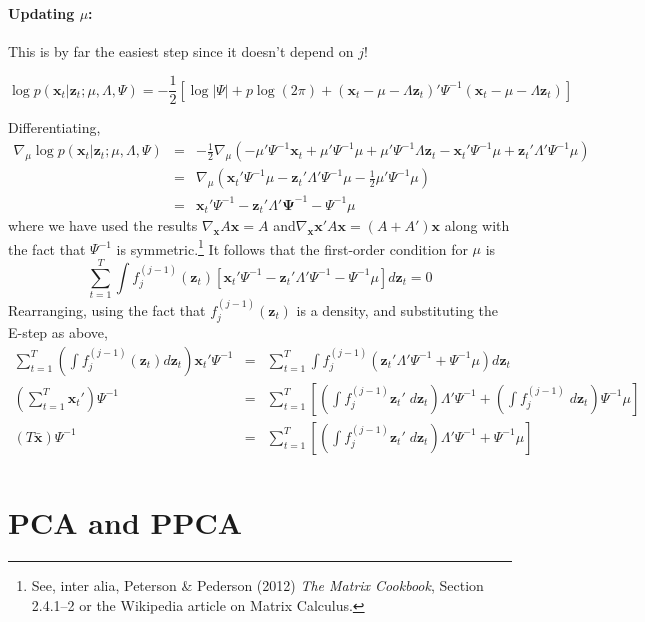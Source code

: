 \documentclass[12pt]{article}
\theoremstyle{definition}
\begin{document}
\paragraph{Updating $\mu$:} This is by far the easiest step since it doesn't depend on $j$!


	$$\log p(\textbf{x}_t| \textbf{z}_t;\mu, \Lambda, \Psi) = -\frac{1}{2}\left[  \log |\Psi| + p \log(2\pi) +(\mathbf{x}_t - \mu -  \Lambda \textbf{z}_t)' \Psi^{-1} (\mathbf{x}_t - \mu -  \Lambda \textbf{z}_t)\right] $$

Differentiating,
 \begin{eqnarray*}
 	\nabla_\mu \log p(\mathbf{x}_t|\mathbf{z}_t;\mu, \Lambda, \Psi) &=& -\frac{1}{2} \nabla_\mu \left( -\mu' \Psi^{-1} \mathbf{x}_t + \mu' \Psi^{-1}\mu + \mu' \Psi^{-1} \Lambda \mathbf{z}_t - \mathbf{x}_t' \Psi^{-1} \mu +  \mathbf{z}_t'\Lambda' \Psi^{-1} \mu  \right)\\
 		&=& \nabla_\mu \left(\mathbf{x}_t' \Psi^{-1} \mu - \mathbf{z}_t' \Lambda' \Psi^{-1}\mu - \frac{1}{2} \mu' \Psi^{-1} \mu \right)\\
 		&=& \mathbf{x}_t' \Psi^{-1} - \mathbf{z}_t'\Lambda'\mathbf \Psi^{-1} - \Psi^{-1}\mu
 \end{eqnarray*}
where we have used the results $\nabla_{\mathbf{x}}A \mathbf{x} = A$ and$\nabla_{\mathbf{x}}\mathbf{x}'A \mathbf{x} = (A + A')\mathbf{x}$ along with the fact that $\Psi^{-1}$ is symmetric.\footnote{See, inter alia, Peterson \& Pederson (2012) \emph{The Matrix Cookbook}, Section 2.4.1--2 or the Wikipedia article on Matrix Calculus.} It follows that the first-order condition for $\mu$ is
$$\sum_{t = 1}^T \int f_j^{(j-1)}(\mathbf{z}_t) \left[\mathbf{x}_t' \Psi^{-1} - \mathbf{z}_t'\Lambda' \Psi^{-1} - \Psi^{-1}\mu \right] d \mathbf{z}_t = 0$$
Rearranging, using the fact that $f_j^{(j-1)}(\mathbf{z}_t)$ is a density, and substituting the E-step as above,
	\begin{eqnarray*}
		\sum_{t=1}^T \left(\int f_j^{(j-1)}(\mathbf{z}_t) d \mathbf{z}_t\right) \mathbf{x}_t' \Psi^{-1} &=& \sum_{t=1}^T\int f_j^{(j-1)}\left( \mathbf{z}_t'\Lambda' \Psi^{-1} + \Psi^{-1}\mu \right) d \mathbf{z}_t\\
		\left(\sum_{t=1}^T\mathbf{x}_t'\right) \Psi^{-1} &=& \sum_{t=1}^T  \left[\left(\int f_j^{(j-1)} \mathbf{z}_t' \; d \mathbf{z}_t\right)\Lambda' \Psi^{-1} + \left(\int f_j^{(j-1)} \; d \mathbf{z}_t \right)\Psi^{-1} \mu \right]\\
		\left(T \bar{\mathbf{x}}\right)\Psi^{-1} &=& \sum_{t=1}^T  \left[\left(\int f_j^{(j-1)} \mathbf{z}_t' \; d \mathbf{z}_t\right)\Lambda' \Psi^{-1} +\Psi^{-1} \mu \right]\\
	\end{eqnarray*}

\section{PCA and PPCA}
\end{document}
